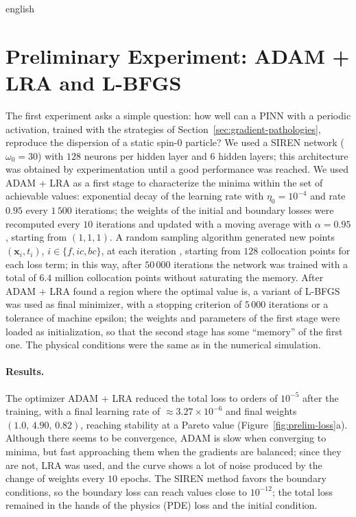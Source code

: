 \documentclass[0000.tex]{subfiles}
\begin{document}
\begin{hyphenrules}{english}
\section{Preliminary Experiment: ADAM + LRA and L-BFGS}\label{sec:exp-preliminary}

The first experiment asks a simple question: how well can a PINN with a periodic activation, trained with
the strategies of Section~\ref{sec:gradient-pathologies}, reproduce the dispersion of a static spin-0 particle?
We used a SIREN network ($\omega_0=30$) with $128$ neurons per hidden layer and $6$ hidden layers; this
architecture was obtained by experimentation until a good performance was reached. We used ADAM + LRA as a
first stage to characterize the minima within the set of achievable values: exponential decay of the
learning rate with $\eta_0=10^{-4}$ and rate $0.95$ every $1\,500$ iterations; the weights of the initial
and boundary losses were recomputed every $10$ iterations and updated with a moving average with
$\alpha=0.95$, starting from $(1,1,1)$. A random sampling algorithm generated new points
$(\mathbf{x}_i,t_i)$, $i\in\{f,ic,bc\}$, at each iteration \cite{wang2021gradient,liu2022}, starting from $128$
collocation points for each loss term; in this way, after $50\,000$ iterations the network was trained
with a total of $6.4$ million collocation points without saturating the memory. After ADAM + LRA found a region where the
optimal value is, a variant of L-BFGS was used as final minimizer, with a stopping criterion of $5\,000$
iterations or a tolerance of machine epsilon; the weights and parameters of the first stage were loaded as
initialization, so that the second stage has some ``memory'' of the first one. The physical conditions
were the same as in the numerical simulation.

\paragraph{Results.}
The optimizer ADAM + LRA reduced the total loss to orders of $10^{-5}$ after the training, with a final
learning rate of $\approx3.27\times10^{-6}$ and final weights $(1.0,\,4.90,\,0.82)$, reaching stability at
a Pareto value (Figure~\ref{fig:prelim-loss}a). Although there seems to be convergence, ADAM is slow when
converging to minima, but fast approaching them when the gradients are balanced; since they are not, LRA
was used, and the curve shows a lot of noise produced by the change of weights every $10$ epochs. The
SIREN method favors the boundary conditions, so the boundary loss can reach values close to $10^{-12}$; the
total loss remained in the hands of the physics (PDE) loss and the initial condition.


\end{hyphenrules}
\end{document}
